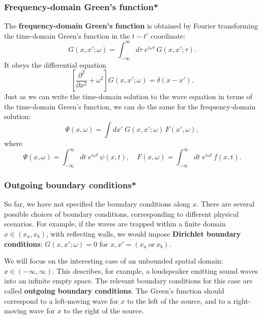 \documentclass[10pt,a4paper]{article}
\begin{document}
\subsubsection{Frequency-domain Green's function*}
\label{frequency-domain-greens-function}

The \textbf{frequency-domain Green's function} is obtained by Fourier
transforming the time-domain Green's function in the $t-t'$
coordinate:
\begin{equation}
G(x,x';\omega) = \int_{-\infty}^\infty d\tau\; e^{i\omega \tau}\, G(x,x'; \tau).
\end{equation}
It obeys the differential equation
\begin{equation}
\left[\frac{\partial^2}{\partial x^2} + \omega^2 \right] G(x,x';\omega) = \delta(x-x').
\end{equation}
Just as we can write the time-domain solution to the wave equation in
terms of the time-domain Green's function, we can do the same for the
frequency-domain solution:
\begin{equation}
\Psi(x,\omega) = \int dx' \; G(x,x';\omega) \, F(x', \omega),
\end{equation}
where
\begin{equation}
\Psi(x,\omega) = \int_{-\infty}^\infty dt \; e^{i\omega t} \, \psi(x,t), \quad F(x,\omega) = \int_{-\infty}^\infty dt \; e^{i\omega t} \, f(x,t).
\end{equation}

\subsubsection{Outgoing boundary conditions*}
\label{outgoing-boundary-conditions}

So far, we have not specified the boundary conditions along $x$.
There are several possible choices of boundary conditions,
corresponding to different physical scenarios.  For example, if the
waves are trapped within a finite domain $x \in (x_a,x_b)$, with
reflecting walls, we would impose \textbf{Dirichlet boundary
  conditions}: $G(x,x';\omega) = 0$ for $x,x' =
(x_a~\mathrm{or}~x_b)$.

We will focus on the interesting case of an unbounded spatial domain:
$x \in (-\infty, \infty)$. This describes, for example, a loudspeaker
emitting sound waves into an infinite empty space. The relevant
boundary conditions for this case are called \textbf{outgoing boundary
  conditions}. The Green's function should correspond to a left-moving
wave for $x$ to the left of the source, and to a right-moving wave for
$x$ to the right of the source.
\end{document}
